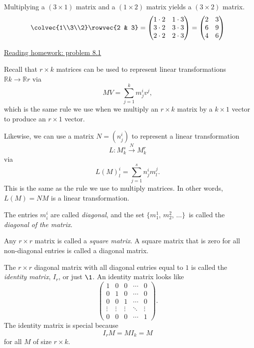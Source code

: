 \begin{example}
Multiplying a $(3\times 1)$ matrix and a $(1\times 2)$ matrix yields a $(3\times 2)$ matrix.
\[
\colvec{1\\3\\2} \rowvec{2 & 3} = 
\begin{pmatrix}
1\cdot 2 & 1\cdot 3 \\
3\cdot 2 & 3\cdot 3 \\
2\cdot 2 & 2\cdot 3 \\
\end{pmatrix}
= \begin{pmatrix}
2 & 3 \\
6 & 9 \\
4 & 6 \\
\end{pmatrix}
\]
\end{example}

\begin{center}\href{\webworkurl ReadingHomework8/1/}{Reading homework: problem 8.1}\end{center}

Recall that $r\times k$ matrices can be used to represent linear transformations 
$ \mathbb{R}k \rightarrow \mathbb{R}r $
via \[MV = \sum_{j=1}^{k} m_j^iv^j , \] which is the same rule we use when we multiply an $r\times k$ matrix by a $k\times 1$ vector to produce an $r\times1$ vector.

Likewise, we can use a matrix $N=(n^i_j)$ to represent a linear transformation
\[
L \colon M^s_k \stackrel{N}{\longrightarrow} M^r_k
\]
via 
\[
L(M)^i_l = \sum_{j=1}^{s} n_j^im^j_l.
\]
This is the same as the rule we use to multiply matrices. \hypertarget{leftmult}{In other words,} \(L(M)=NM\) is a linear transformation.

\begin{definition}
The entries $m_i^i$ are called \emph{diagonal}, and the set $\{m_1^1$, $m_2^2$, $\ldots \}$~is called the \emph{diagonal of the matrix}.

Any $r\times r$ matrix is called a \emph{square matrix}.  A square matrix that is zero for all non-diagonal entries is called a diagonal matrix.

The $r\times r$ diagonal matrix with all diagonal entries equal to $1$ is called the \emph{identity matrix}, $I_r$, or just $\1$.  An identity matrix looks like \[
\begin{pmatrix}
1 & 0 & 0 & \cdots & 0 \\
0 & 1 & 0 & \cdots & 0 \\
0 & 0 & 1 & \cdots & 0 \\
\vdots & \vdots & \vdots & \ddots & \vdots \\
0 & 0 & 0 & \cdots & 1
\end{pmatrix}.
\]
The identity matrix is special because \[I_rM=MI_k=M\] for all $M$ of size $r\times k$.
\end{definition}

